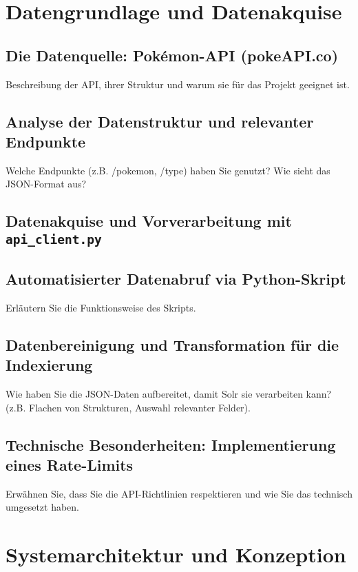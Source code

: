 \section{Datengrundlage und Datenakquise}
\label{chap:daten}

\subsection{Die Datenquelle: Pokémon-API (pokeAPI.co)}
\label{sec:datenquelle}
Beschreibung der API, ihrer Struktur und warum sie für das Projekt geeignet ist.

\subsection{Analyse der Datenstruktur und relevanter Endpunkte}
\label{sec:datenstruktur}
Welche Endpunkte (z.B. /pokemon, /type) haben Sie genutzt? Wie sieht das JSON-Format aus?

\subsection{Datenakquise und Vorverarbeitung mit \texttt{api\_client.py}}
\label{sec:datenakquise}

\subsection{Automatisierter Datenabruf via Python-Skript}
Erläutern Sie die Funktionsweise des Skripts.

\subsection{Datenbereinigung und Transformation für die Indexierung}
Wie haben Sie die JSON-Daten aufbereitet, damit Solr sie verarbeiten kann? (z.B. Flachen von Strukturen, Auswahl relevanter Felder).

\subsection{Technische Besonderheiten: Implementierung eines Rate-Limits}
Erwähnen Sie, dass Sie die API-Richtlinien respektieren und wie Sie das technisch umgesetzt haben.


\section{Systemarchitektur und Konzeption}
\label{chap:architektur}

